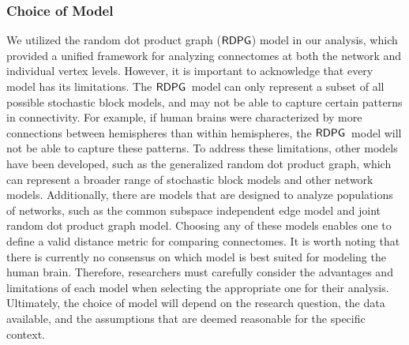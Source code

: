 \subsubsection{Choice of Model}
We utilized the random dot product graph ($\operatorname{\mathsf{RDPG}}$) model in our analysis, which provided a unified framework for analyzing connectomes at both the network and individual vertex levels. However, it is important to acknowledge that every model has its limitations. The $\operatorname{\mathsf{RDPG}}$\ model can only represent a subset of all possible stochastic block models, and may not be able to capture certain patterns in connectivity. For example, if human brains were characterized by more connections between hemispheres than within hemispheres, the $\operatorname{\mathsf{RDPG}}$\ model will not be able to capture these patterns. To address these limitations, other models have been developed, such as the generalized random dot product graph, which can represent a broader range of stochastic block models and other network models. Additionally, there are models that are designed to analyze populations of networks, such as the common subspace independent edge model and joint random dot product graph model. Choosing any of these models enables one to define a valid distance metric for comparing connectomes. It is worth noting that there is currently no consensus on which model is best suited for modeling the human brain. Therefore, researchers must carefully consider the advantages and limitations of each model when selecting the appropriate one for their analysis. Ultimately, the choice of model will depend on the research question, the data available, and the assumptions that are deemed reasonable for the specific context.